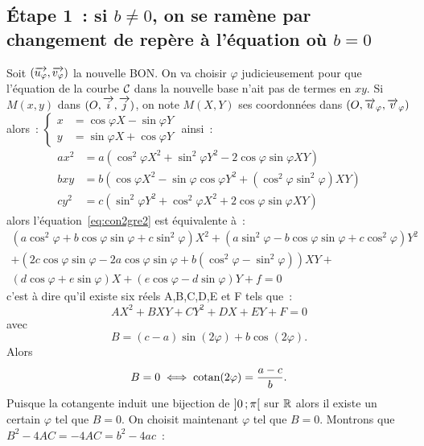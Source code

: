 \subsection{Étape 1~: si \(b\neq 0\), on se ramène par changement de repère à 
l'équation où \(b=0\)}
Soit \((\overrightarrow{u_{\varphi}},\overrightarrow{v_{\varphi}})\) la nouvelle BON\@. On va 
choisir \(\varphi\) judicieusement pour que l'équation de la courbe 
\(\mathcal{C}_{{}}\) dans la nouvelle base n'ait pas de termes en \(xy\). Si 
\(M(x,y)\) dans \((O,\overrightarrow{i},\overrightarrow{j})\), on note \(M(X,Y)\) ses coordonnées dans 
\((O,\overrightarrow{u}_\varphi,\overrightarrow{v}_\varphi)\) alors~:
\(\begin{cases} x&=\cos\varphi X - \sin\varphi Y \\ y&=\sin\varphi X + 
\cos\varphi Y\end{cases}\) ainsi~:
\begin{align}
  ax^2&=a(\cos^2\varphi X^2 + \sin^2\varphi Y^2 - 2\cos\varphi\sin\varphi 
  XY)\\
  bxy&=b(\cos\varphi X^2 -\sin\varphi\cos\varphi Y^2 + (\cos^2\varphi 
  \sin^2\varphi)XY)\\
  cy^2&=c(\sin^2\varphi Y^2 + \cos^2\varphi X^2 + 2\cos\varphi\sin\varphi XY)
\end{align}
alors l'équation~\eqref{eq:con2gre2} est équivalente à~:
\begin{multline}
  (a\cos^2\varphi + b\cos\varphi\sin\varphi 
  +c\sin^2\varphi)X^2+(a\sin^2\varphi - b\cos\varphi\sin\varphi 
  +c\cos^2\varphi)Y^2\\+(2c\cos\varphi\sin\varphi-2a\cos\varphi\sin\varphi+b(\cos^2\varphi 
  - \sin^2\varphi))XY + \\ (d\cos\varphi + e\sin\varphi)X +(e\cos\varphi - 
  d\sin\varphi)Y +f=0
\end{multline}
c'est à dire qu'il existe six réels A,B,C,D,E et F tels que~:
\begin{equation}
  AX^2+BXY+CY^2+DX+EY+F=0 \label{eq:eqz}
\end{equation}
avec
\begin{equation}
  B=(c-a)\sin(2\varphi)+b\cos(2\varphi).
\end{equation}
Alors
\begin{equation}
  B=0 \iff \operatorname{cotan}(2\varphi)=\frac{a-c}{b}.
\end{equation}
Puisque la cotangente induit une bijection de \(\left] 0 \, ;  \pi \right[\) sur 
\(\mathbb{R}\) alors il existe un certain \(\varphi\) tel que \(B=0\). On choisit 
maintenant \(\varphi\) tel que \(B=0\). Montrons que 
\(B^2-4AC=-4AC=b^2-4ac\)~:
